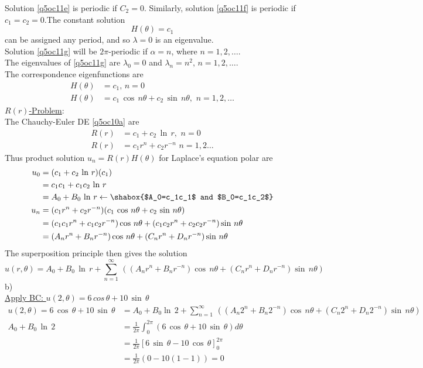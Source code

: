 Solution \eqref{q5oc11e} is periodic if $C_2=0$. Similarly, solution \eqref{q5oc11f} is periodic if $c_1=c_2=0$.The constant solution
\begin{equation}
H(\theta)=c_1\label{soq5oc11a}
\end{equation}
can be assigned any period, and so $\lambda=0$ is an eigenvalue.\\
Solution \eqref{q5oc11g} will be $2\pi$-periodic if $\alpha=n$, where $n=1,2,\ldots$. \\The eigenvalues of \eqref{q5oc11g} are $\lambda_0=0$ and $\lambda_n=n^2,\,n=1,2,\ldots$.\\
The correspondence  eigenfunctions are
\begin{align}
H(\theta)&=c_1,\,n=0\label{soq5oc11a}\\
H(\theta)&=c_1\,\cos\,n\theta+c_2\,\sin\,n\theta,\,\,n=1,2,\ldots\label{soq5oc11c}
\end{align}
\underline{$R(r)$-Problem}:\\
The Chauchy-Euler DE \eqref{q5oc10a} are
\begin{align}
R(r)&=c_1+c_2\,\ln\,r,\,\,n=0\label{soq5oc11d}\\
R(r)&=c_1r^n+c_2r^{-n}\,\,n=1,2\ldots\label{soq5oc11e}
\end{align}
Thus product solution $u_n=R(r)H(\theta)$ for Laplace's equation  polar are
\begin{align*}
u_0&=(c_1+c_2\,\ln\,r)(c_1)\\
&=c_1c_1+c_1c_2\,\ln\,r\\
&=A_0+B_0\,\ln\,r\leftarrow\shabox{$A_0=c_1c_1$ and $B_0=c_1c_2$}\\
u_n&=(c_1r^n+c_2r^{-n})(c_1\,\cos\,n\theta+c_2\,\sin\,n\theta)\\
&=(c_1c_1r^n+c_1c_2r^{-n})\cos\,n\theta+(c_1c_2r^n+c_2c_2r^{-n})\sin\,n\theta\\
&=(A_nr^n+B_nr^{-n})\cos\,n\theta+(C_nr^n+D_nr^{-n})\sin\,n\theta
\end{align*}
The superposition principle then gives the solution
\begin{equation}
u(r,\theta)=A_0+B_0\,\ln\,r+\sum_{n=1}^\infty\,\left((A_nr^n+B_nr^{-n})\cos\,n\theta+(C_nr^n+D_nr^{-n})\sin\,n\theta\right)\label{soq5oc11f}
\end{equation}
b)\\
\underline{Apply BC: $u(2,\theta)=6\,cos\,\theta+ 10\,\sin\,\theta$}
\begin{align*}
u(2,\theta)=6\,\cos\,\theta+ 10\,\sin\,\theta&=A_0+B_0\ln\,2+\sum_{n=1}^\infty\,\left((A_n2^n+B_n2^{-n})\cos\,n\theta+(C_n2^n+D_n2^{-n})\sin\,n\theta\right)\\
A_0+B_0\,\ln\,2&=\frac{1}{2\pi}\int_0^{2\pi}(6\,\cos\,\theta+ 10\,\sin\,\theta)d\theta\\
&=\frac{1}{2\pi}\left[6\,\sin\,\theta-10\,\cos\,\theta\right]_0^{2\pi}\\
&=\frac{1}{2\pi}(0-10(1-1))=0\\
\end{align*}
